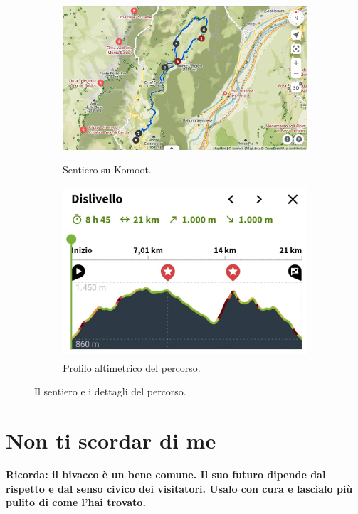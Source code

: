 \documentclass{article}
\begin{document}
\begin{figure}[htbp!]
\begin{subfigure}[t]{0.45\textwidth}
        \centering
        \vspace{0pt} %
        \includegraphics[width=\textwidth]{images/sentiero_komoot.png}
        \caption{Sentiero su Komoot.}
        \label{fig:foto_corta1}
        \vspace{1em} %
        \includegraphics[width=\textwidth]{images/profilo_altimetrico.png}
        \caption{Profilo altimetrico del percorso.}
        \label{fig:foto_corta2}
    \end{subfigure}
    \caption{Il sentiero e i dettagli del percorso.}
    \label{fig:panoramica_dettagli}
\end{figure}


\section{Non ti scordar di me}
\textbf{\textcolor{BurntOrange}{Ricorda: il bivacco è un bene comune. Il suo futuro dipende dal rispetto e dal senso civico dei visitatori. Usalo con cura e lascialo più pulito di come l'hai trovato.}}
\end{document}
